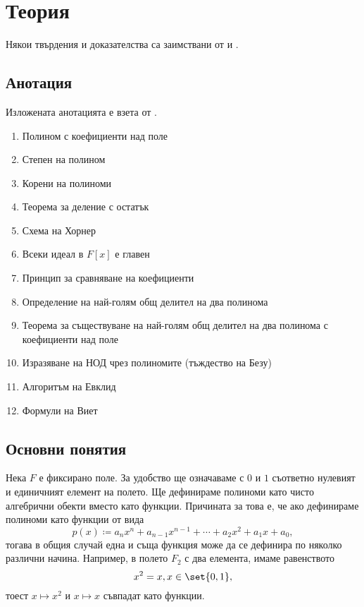 \documentclass{../../common/topic}
\begin{document}
\maketitle

\section{Теория}

Някои твърдения и доказателства са заимствани от \cite{Knapp} и \cite{RoyachkiNotes}.

\subsection{Анотация}

Изложената анотацията е взета от \cite{Syllabus}.

\begin{enumerate}
  \item Полином с коефициенти над поле
  \item Степен на полином
  \item Корени на полиноми
  \item Теорема за деление с остатък
  \item Схема на Хорнер
  \item Всеки идеал в \( F[x] \) е главен
  \item Принцип за сравняване на коефициенти
  \item Определение на най-голям общ делител на два полинома
  \item Теорема за съществуване на най-голям общ делител на два полинома с коефициенти над поле
  \item Изразяване на НОД чрез полиномите (тъждество на Безу)
  \item Алгоритъм на Евклид
  \item Формули на Виет
\end{enumerate}

\subsection{Основни понятия}

Нека \( F \) е фиксирано поле. За удобство ще означаваме с \( 0 \) и \( 1 \) съответно нулевият и единичният елемент на полето. Ще дефинираме полиноми като чисто алгебрични обекти вместо като функции. Причината за това е, че ако дефинираме полиноми като функции от вида
\begin{equation*}
  p(x) \coloneqq a_n x^n + a_{n-1} x^{n-1} + \cdots + a_2 x^2 + a_1 x + a_0,
\end{equation*}
тогава в общия случай една и съща функция може да се дефинира по няколко различни начина. Например, в полето \( F_2 \) с два елемента, имаме равенството
\begin{equation*}
  x^2 = x, x \in \set{ 0, 1 },
\end{equation*}
тоест \( x \mapsto x^2 \) и \( x \mapsto x \) съвпадат като функции.
\end{document}
